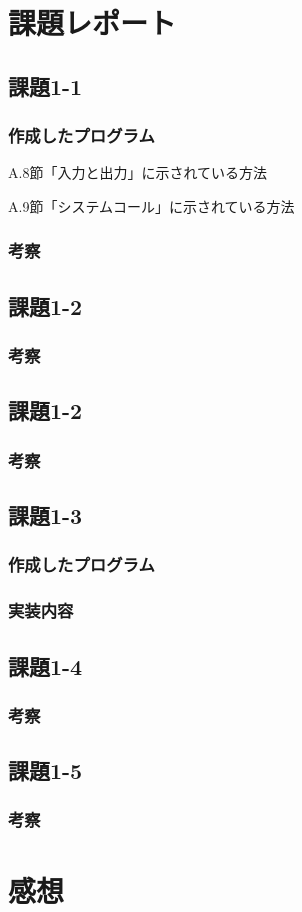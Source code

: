 \documentclass[a4j,11pt]{jarticle}
\begin{document}
\section{課題レポート}
 \subsection{課題1-1}
  \subsubsection{作成したプログラム}
  \begin{screen}
    A.8節「入力と出力」に示されている方法
  \end{screen}
  

  \begin{screen}
    A.9節「システムコール」に示されている方法
    \end{screen}
  

  \subsubsection{考察}


 \subsection{課題1-2}
  \subsubsection{考察}
  

 \subsection{課題1-2}
  \subsubsection{考察}


 \subsection{課題1-3}
 \subsubsection{作成したプログラム}
 
  \subsubsection{実装内容}


 \subsection{課題1-4}
  \subsubsection{考察}


 \subsection{課題1-5}
  \subsubsection{考察}

\section{感想}
\end{document}
